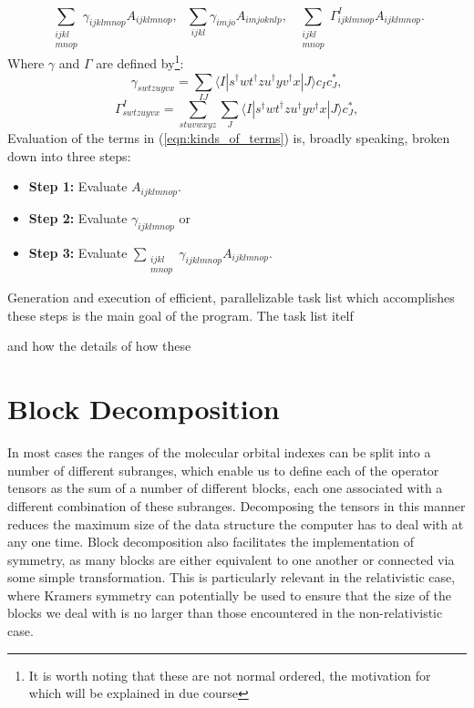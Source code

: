 \begin{equation}
\sum_{\substack{ijkl \\ mnop} }\gamma_{ijklmnop} A_{ijklmnop},
\text{ \ \ \ \ \ \ \ \ }
\sum_{ijkl}\gamma_{imjo} A_{imjoknlp},
\text{ \ \ \ \ \ \ \ \ }
\sum_{\substack{ijkl \\ mnop}}\Gamma^{I}_{ijklmnop} A_{ijklmnop}.
\label{eqn:kinds_of_terms}
\end{equation}
\noindent Where $\gamma$ and $\Gamma$ are defined by\footnote{It is worth noting that these are not normal ordered, the motivation for which
will be explained in due course}:
\begin{equation}
\gamma_{swtzuyvx} = \sum_{IJ} \langle I | s^{\dagger}wt^{\dagger}zu^{\dagger}yv^{\dagger}x | J \rangle c_{I} c^{*}_{J},
\end{equation}
\begin{equation}
\Gamma_{swtzuyvx}^{I} = 
\sum_{stuvwxyz} \sum_{J} \langle I | s^{\dagger}wt^{\dagger}zu^{\dagger}yv^{\dagger}x | J \rangle c^{*}_{J},
\end{equation}
\noindent Evaluation of the terms in (\ref{eqn:kinds_of_terms}) is, broadly speaking, broken down into three steps:
\begin{itemize}
\item \textbf{Step 1:}  Evaluate $A_{ijklmnop}$.
\item \textbf{Step 2:}  Evaluate $\gamma_{ijklmnop}$ or 
\item \textbf{Step 3:}  Evaluate $\sum_{\substack{ijkl \\ mnop}}\gamma_{ijklmnop} A_{ijklmnop}$.
\end{itemize}

\noindent Generation and execution of efficient, parallelizable task list which accomplishes these
steps is the main goal of the program. The task list itelf 

 and  how the details of how these 

\section{Block Decomposition}
\noindent In most cases the ranges of the molecular orbital indexes can be split into a
number of different subranges, which enable us to define each of the operator
tensors as the sum of a number of different blocks, each one associated with a
different combination of these subranges. Decomposing the tensors in this
manner reduces the maximum size of the data structure the computer has to deal
with at any one time. Block decomposition also facilitates the implementation
of symmetry, as many blocks are either equivalent to one another or connected
via some simple transformation. This is particularly relevant in the
relativistic case, where Kramers symmetry can potentially be used to ensure
that the size of the blocks we deal with is no larger than those encountered in
the non-relativistic case.\\

